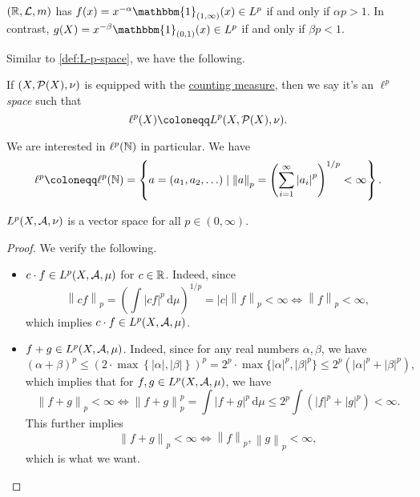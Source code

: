 \begin{eg}
	\((\mathbb{\MakeUppercase{r}} , \mathcal{\MakeUppercase{l}} , m)\) has \(f(x) = x^{-\alpha } \mathbbm{1}_{(1, \infty )}(x) \in L^p\) if and only if \(\alpha p > 1\).
	In contrast, \(g(X) = x^{-\beta } \mathbbm{1}_{(0, 1)}(x) \in L^p\) if and only if \(\beta p<1\).
\end{eg}

Similar to \autoref{def:L-p-space}, we have the following.
\begin{definition}\label{def:l-p-space}
	If \((X, \mathcal{\MakeUppercase{p}} (X), \nu )\) is equipped with the \hyperref[eg:counting-measure]{counting measure}, then we say it's an \emph{\(\ell ^p\) space} such that
	\[
		\ell ^p(X) \coloneqq L^p(X, \mathcal{\MakeUppercase{p}} (X), \nu ).
	\]
\end{definition}
\begin{remark}
	We are interested in \(\ell ^p(\mathbb{\MakeUppercase{n}} )\) in particular. We have
	\[
		\ell ^p\coloneqq \ell ^p(\mathbb{\MakeUppercase{n}} ) = \left\{a = (a_1, a_2, \ldots  )\mid \left\lVert a\right\rVert _p = \left(\sum\limits_{i=1}^{\infty} \left\vert a_{i} \right\vert^p \right)^{1/p}< \infty \right\}.
	\]
\end{remark}

\begin{lemma}
	\(L^p(X, \mathcal{\MakeUppercase{a}} , \nu )\) is a vector space for all \(p\in (0, \infty )\).
\end{lemma}
\begin{proof}
	We verify the following.
	\begin{itemize}
		\item \(c\cdot f \in L^p(X, \mathcal{\MakeUppercase{a}} , \mu )\) for \(c\in \mathbb{\MakeUppercase{r}} \). Indeed, since
		      \[
			      \left\lVert cf\right\rVert _p = \left(\int \left\vert cf \right\vert ^p\,\mathrm{d} \mu \right)^{1/p} = \left\vert c \right\vert \left\lVert f\right\rVert _p < \infty \iff \left\lVert f\right\rVert _p <\infty,
		      \]
		      which implies \(c\cdot f\in L^p(X, \mathcal{\MakeUppercase{a}} , \mu )\).
		\item \(f + g\in L^p(X, \mathcal{\MakeUppercase{a}} , \mu )\). Indeed, since for any real numbers \(\alpha , \beta \), we have
		      \[
			      (\alpha +\beta )^p \leq (2\cdot \mathop{\max} \left\{\left\vert \alpha  \right\vert, \left\vert \beta  \right\vert  \right\})^p = 2^p \cdot \mathop{\max} \{\left\vert \alpha  \right\vert^p, \left\vert \beta  \right\vert ^p \}\leq 2^p \left(\left\vert \alpha  \right\vert^p + \left\vert \beta  \right\vert^p  \right),
		      \]
		      which implies that for \(f, g\in L^p (X, \mathcal{\MakeUppercase{a}} , \mu )\), we have
		      \[
			      \left\lVert f+g\right\rVert _p < \infty \iff \left\lVert f + g\right\rVert _p^p = \int \left\vert f + g \right\vert ^p \,\mathrm{d} \mu  \leq 2^p \int (\left\vert f \right\vert ^p + \left\vert g \right\vert ^p)< \infty.
		      \]
		      This further implies
		      \[
			      \left\lVert f + g\right\rVert _p < \infty  \iff \left\lVert f\right\rVert _p, \left\lVert g\right\rVert _p < \infty ,
		      \]
		      which is what we want.
	\end{itemize}
\end{proof}

